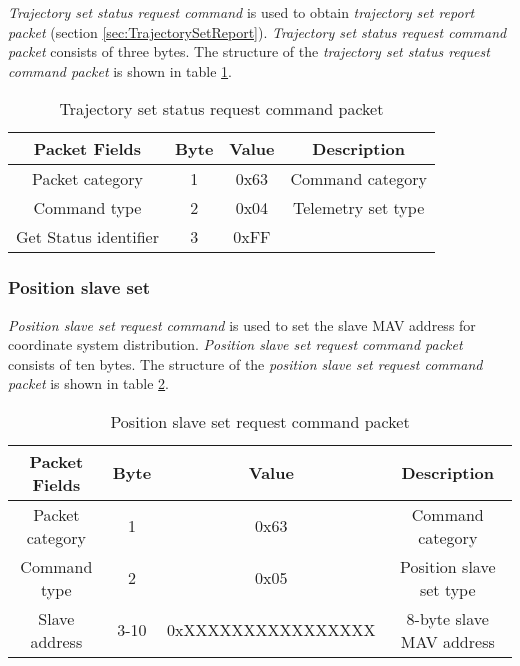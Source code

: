 \textit{Trajectory set status request command} is used to obtain \textit{trajectory set report packet} (section \ref{sec:TrajectorySetReport}).
\textit{Trajectory set status request command  packet} consists of three bytes. The structure of the \textit{trajectory set status request command packet} is shown in table \ref{tab:trajectorySetStatusRequestCommandPacket}.
\begin{table}[h]
\begin{center}
\begin{tabular}{c c c c}
\toprule
\rowcolor[HTML]{FFFC9E} 
\textbf{Packet Fields} & \textbf{Byte} & \textbf{Value} & \textbf{Description}                     \\ \midrule
Packet category        & 1             & 0x63           & Command category                         \\ [1ex]
Command type           & 2             & 0x04           & Telemetry set type                       \\ [1ex]
Get Status identifier  & 3             & 0xFF           &     \\ [1ex] \bottomrule
\end{tabular}
\end{center}
\caption{Trajectory set status request command packet}
\label{tab:trajectorySetStatusRequestCommandPacket}
\end{table}

\subsubsection{Position slave set}
\label{sec:positionSlaveSetCommand}
\textit{Position slave set request command} is used to set the slave MAV address for coordinate system distribution.  \textit{Position slave set request command packet} consists of ten bytes. The structure of the \textit{position slave set request command packet} is shown in table \ref{tab:positionSlaveSetRequestCommandPacket}.
\begin{table}[H]
\begin{center}
\begin{tabular}{c c c c}
\toprule
\rowcolor[HTML]{FFFC9E} 
\textbf{Packet Fields} & \textbf{Byte} & \textbf{Value}     & \textbf{Description}                     \\ \midrule
Packet category        & 1             & 0x63               & Command category                         \\ [1ex]
Command type           & 2             & 0x05               & Position slave set type                  \\ [1ex]
Slave address          & 3-10          & 0xXXXXXXXXXXXXXXXX &  8-byte slave MAV address  \\ [1ex] \bottomrule
\end{tabular}
\end{center}
\caption{Position slave set request command packet}
\label{tab:positionSlaveSetRequestCommandPacket}
\end{table}


